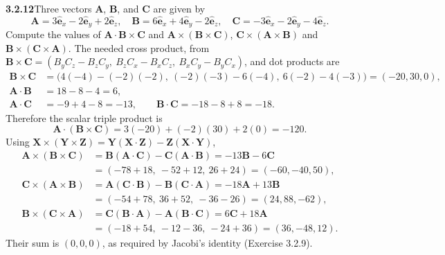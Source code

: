 \par\bigskip
\noindent\textbf{3.2.12}\quad Three vectors $\mathbf{A}$, $\mathbf{B}$, and
$\mathbf{C}$ are given by
\[
\mathbf{A}=3\hat{\mathbf{e}}_{x}-2\hat{\mathbf{e}}_{y}+2\hat{\mathbf{e}}_{z},\quad
\mathbf{B}=6\hat{\mathbf{e}}_{x}+4\hat{\mathbf{e}}_{y}-2\hat{\mathbf{e}}_{z},\quad
\mathbf{C}=-3\hat{\mathbf{e}}_{x}-2\hat{\mathbf{e}}_{y}-4\hat{\mathbf{e}}_{z}.
\]
Compute the values of $\mathbf{A}\cdot\mathbf{B}\times\mathbf{C}$ and
$\mathbf{A}\times(\mathbf{B}\times\mathbf{C})$,
$\mathbf{C}\times(\mathbf{A}\times\mathbf{B})$ and
$\mathbf{B}\times(\mathbf{C}\times\mathbf{A})$.
\solution
The needed cross product, from
$\mathbf B\times\mathbf C=(B_yC_z-B_zC_y,\ B_zC_x-B_xC_z,\ B_xC_y-B_yC_x)$,
and dot products are
\[
\begin{aligned}
\mathbf B\times\mathbf C&=\bigl(4(-4)-(-2)(-2),\ (-2)(-3)-6(-4),\
6(-2)-4(-3)\bigr)=(-20,30,0),\\
\mathbf A\cdot\mathbf B&=18-8-4=6,\\
\mathbf A\cdot\mathbf C&=-9+4-8=-13,\qquad
\mathbf B\cdot\mathbf C=-18-8+8=-18.
\end{aligned}
\]
Therefore the scalar triple product is
\[
\boxed{\mathbf A\cdot(\mathbf B\times\mathbf C)
=3(-20)+(-2)(30)+2(0)=-120}.
\]
Using $\mathbf X\times(\mathbf Y\times\mathbf Z)
=\mathbf Y(\mathbf X\cdot\mathbf Z)-\mathbf Z(\mathbf X\cdot\mathbf Y)$,
\[
\begin{aligned}
\mathbf A\times(\mathbf B\times\mathbf C)
&=\mathbf B(\mathbf A\cdot\mathbf C)-\mathbf C(\mathbf A\cdot\mathbf B)
=-13\mathbf B-6\mathbf C\\
&=(-78+18,\ -52+12,\ 26+24)=\boxed{(-60,-40,50)},\\
\mathbf C\times(\mathbf A\times\mathbf B)
&=\mathbf A(\mathbf C\cdot\mathbf B)-\mathbf B(\mathbf C\cdot\mathbf A)
=-18\mathbf A+13\mathbf B\\
&=(-54+78,\ 36+52,\ -36-26)=\boxed{(24,88,-62)},\\
\mathbf B\times(\mathbf C\times\mathbf A)
&=\mathbf C(\mathbf B\cdot\mathbf A)-\mathbf A(\mathbf B\cdot\mathbf C)
=6\mathbf C+18\mathbf A\\
&=(-18+54,\ -12-36,\ -24+36)=\boxed{(36,-48,12)}.
\end{aligned}
\]
Their sum is $(0,0,0)$, as required by Jacobi's identity
(Exercise 3.2.9).

